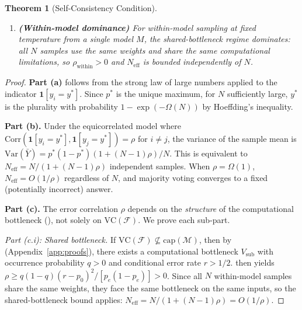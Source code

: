 \documentclass{article}
\newtheorem{theorem}{Theorem}
\theoremstyle{definition}
\theoremstyle{remark}
\newcommand{\VC}{\mathrm{VC}}           %
\newcommand{\calM}{\mathcal{M}}         %
\newcommand{\calF}{\mathcal{F}}         %
\begin{document}
\begin{theorem}[Self-Consistency Condition]
\begin{enumerate}[label=(\alph*)]
\begin{enumerate}[label=(\roman*)]
        This is consistent with the empirical finding of $\rho = 0.06$ for 3-SAT near the phase transition ().
        Self-consistency across diverse models can improve accuracy.
        \item \textbf{(Within-model dominance)} For within-model sampling at fixed temperature from a single model $M$, the shared-bottleneck regime dominates: all $N$ samples use the same weights and share the same computational limitations, so $\rho_{\mathrm{within}} > 0$ and $N_{\mathrm{eff}}$ is bounded independently of $N$.
    \end{enumerate}
\end{enumerate}
\end{theorem}

\begin{proof}
\textbf{Part (a)} follows from the strong law of large numbers applied to the indicator $\mathbf{1}[y_i = y^*]$.
Since $p^*$ is the unique maximum, for $N$ sufficiently large, $y^*$ is the plurality with probability $1 - \exp(-\Omega(N))$ by Hoeffding's inequality.

\textbf{Part (b).}
Under the equicorrelated model where $\mathrm{Corr}(\mathbf{1}[y_i = y^*], \mathbf{1}[y_j = y^*]) = \rho$ for $i \neq j$, the variance of the sample mean is $\mathrm{Var}(\bar{Y}) = p^*(1-p^*)(1 + (N-1)\rho) / N$.
This is equivalent to $N_{\text{eff}} = N / (1 + (N-1)\rho)$ independent samples.
When $\rho = \Omega(1)$, $N_{\text{eff}} = O(1/\rho)$ regardless of $N$, and majority voting converges to a fixed (potentially incorrect) answer.

\textbf{Part (c).}
The error correlation $\rho$ depends on the \emph{structure} of the computational bottleneck (), not solely on $\VC(\calF)$.
We prove each sub-part.

\emph{Part (c.i): Shared bottleneck.}
If $\VC(\calF) \not\subseteq \mathrm{cap}(\calM)$, then by  (Appendix~\ref{app:proofs}), there exists a computational bottleneck $V_{\mathrm{sub}}$ with occurrence probability $q > 0$ and conditional error rate $r > 1/2$.
 then yields $\rho \geq q(1-q)(r - p_0)^2 / [p_e(1 - p_e)] > 0$.
Since all $N$ within-model samples share the same weights, they face the same bottleneck on the same inputs, so the shared-bottleneck bound applies: $N_{\mathrm{eff}} = N/(1 + (N-1)\rho) = O(1/\rho)$.


\end{proof}
\end{document}
